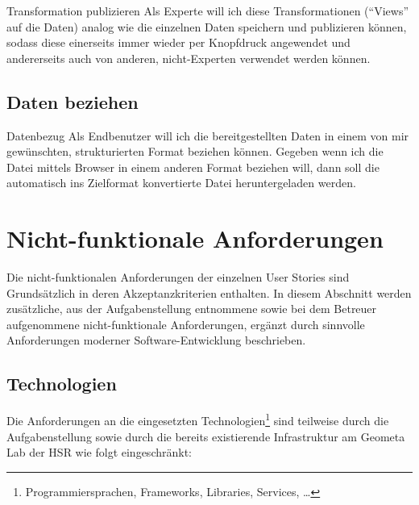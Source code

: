 \begin{scrumstory}[label=story:pd:views]{Transformation publizieren}
	Als Experte will ich diese Transformationen (``Views'' auf die Daten) analog wie die einzelnen Daten speichern und publizieren können, sodass diese einerseits immer wieder per Knopfdruck angewendet und andererseits auch von anderen, nicht-Experten verwendet werden können.
\end{scrumstory}



\subsection{Daten beziehen}

\begin{scrumepic}[label=epic:pd:datenbezug]{Datenbezug}
	Als Endbenutzer will ich die bereitgestellten Daten in einem von mir gewünschten, strukturierten Format beziehen können.
	\storyacceptance	
	Gegeben
	wenn ich die Datei mittels Browser in einem anderen Format beziehen will, dann soll die automatisch ins Zielformat konvertierte Datei heruntergeladen werden.
\end{scrumepic}

\xxx[stories]



\section{Nicht-funktionale Anforderungen}

Die nicht-funktionalen Anforderungen der einzelnen User Stories sind Grundsätzlich in deren Akzeptanzkriterien enthalten.
In diesem Abschnitt werden zusätzliche, aus der Aufgabenstellung entnommene sowie bei dem Betreuer aufgenommene nicht-funktionale Anforderungen, ergänzt durch sinnvolle Anforderungen moderner Software-Entwicklung beschrieben.

\subsection{Technologien}
Die Anforderungen an die eingesetzten Technologien\footnote{Programmiersprachen, Frameworks, Libraries, Services, \dots} sind teilweise durch die Aufgabenstellung sowie durch die bereits existierende Infrastruktur am Geometa Lab der HSR wie folgt eingeschränkt:

